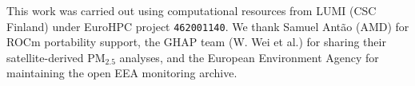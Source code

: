 \documentclass[gmd, manuscript]{copernicus}
\begin{document}

\begin{acknowledgements}
This work was carried out using computational resources from LUMI
(CSC Finland) under EuroHPC project \texttt{462001140}. We thank
Samuel Ant\~ao (AMD) for ROCm portability support, the GHAP team
(W. Wei et al.) for sharing their satellite-derived PM$_{2.5}$ analyses,
and the European Environment Agency for maintaining the open EEA
monitoring archive.
\end{acknowledgements}




\end{document}
